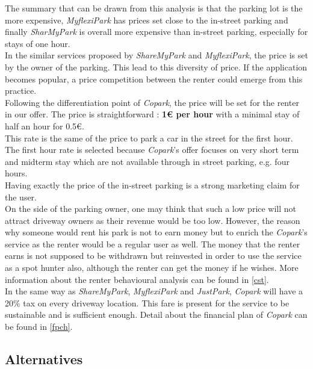 \documentclass[12pt,a4paper,oneside]{book}
\newcommand{\bp}{\textit{Copark}}
\begin{document}
The summary that can be drawn from this analysis is that the parking lot is the more expensive, \textit{MyflexiPark} has prices set close to the in-street parking and finally \textit{SharMyPark} is overall more expensive than in-street parking, especially for stays of one hour.\\

In the similar services proposed by \textit{ShareMyPark} and \textit{MyflexiPark}, the price is set by the owner of the parking. This lead to this diversity of price. If the application becomes popular, a price competition between the renter could emerge from this practice.\\

Following the differentiation point of \bp{}, the price will be set for the renter in our offer. The price is straightforward : \textbf{1\euro{} per hour} with a minimal stay of half an hour for 0.5\euro{}.\\

This rate is the same of the price to park a car in the street for the first hour. The first hour rate is selected because \bp{}'s offer focuses on very short term and midterm stay which are not available through in street parking, e.g. four hours.\\

Having exactly the price of the in-street parking is a strong marketing claim for the user.\\

On the side of the parking owner, one may think that such a low price will not attract driveway owners as their revenue would be too low. However, the reason why someone would rent his park is not to earn money but to enrich the \bp{}'s service as the renter would be a regular user as well. The money that the renter earns is not supposed to be withdrawn but reinvested in order to use the service as a spot hunter also, although the renter can get the money if he wishes. More information about the renter behavioural analysis can be found in \autoref{cst}.\\

In the same way as \textit{ShareMyPark}, \textit{MyflexiPark} and \textit{JustPark}, \bp{} will have a 20\% tax on every driveway location. This fare is present for the service to be sustainable and is sufficient enough. Detail about the financial plan of \bp{} can be found in \autoref{fpch}.\\

\subsection{Alternatives}
\end{document}
